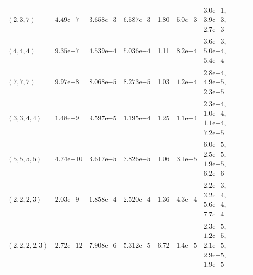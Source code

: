 \begin{table}[ht]
\begin{tabular}{@{}llllrl>{\raggedright\arraybackslash}p{30mm}@{}}
$(2,3,7)$ & $4.49\text{e}{-7}$ & $3.658\text{e}{-3}$ & $6.587\text{e}{-3}$ & 1.80 & $5.0\text{e}{-3}$ & $3.0\text{e}{-1}$, $3.9\text{e}{-3}$, $2.7\text{e}{-3}$ \\
$(4,4,4)$ & $9.35\text{e}{-7}$ & $4.539\text{e}{-4}$ & $5.036\text{e}{-4}$ & 1.11 & $8.2\text{e}{-4}$ & $3.6\text{e}{-3}$, $5.0\text{e}{-4}$, $5.4\text{e}{-4}$ \\
$(7,7,7)$ & $9.97\text{e}{-8}$ & $8.068\text{e}{-5}$ & $8.273\text{e}{-5}$ & 1.03 & $1.2\text{e}{-4}$ & $2.8\text{e}{-4}$, $4.9\text{e}{-5}$, $2.3\text{e}{-5}$ \\
$(3,3,4,4)$ & $1.48\text{e}{-9}$ & $9.597\text{e}{-5}$ & $1.195\text{e}{-4}$ & 1.25 & $1.1\text{e}{-4}$ & $2.3\text{e}{-4}$, $1.0\text{e}{-4}$, $1.1\text{e}{-4}$, $7.2\text{e}{-5}$ \\
$(5,5,5,5)$ & $4.74\text{e}{-10}$ & $3.617\text{e}{-5}$ & $3.826\text{e}{-5}$ & 1.06 & $3.1\text{e}{-5}$ & $6.0\text{e}{-5}$, $2.5\text{e}{-5}$, $1.9\text{e}{-5}$, $6.2\text{e}{-6}$ \\
$(2,2,2,3)$ & $2.03\text{e}{-9}$ & $1.858\text{e}{-4}$ & $2.520\text{e}{-4}$ & 1.36 & $4.3\text{e}{-4}$ & $2.2\text{e}{-3}$, $3.2\text{e}{-4}$, $5.6\text{e}{-4}$, $7.7\text{e}{-4}$ \\
$(2,2,2,2,3)$ & $2.72\text{e}{-12}$ & $7.908\text{e}{-6}$ & $5.312\text{e}{-5}$ & 6.72 & $1.4\text{e}{-5}$ & $2.3\text{e}{-5}$, $1.2\text{e}{-5}$, $2.1\text{e}{-5}$, $2.9\text{e}{-5}$, $1.9\text{e}{-5}$ \\
\bottomrule
\end{tabular}
\end{table}
